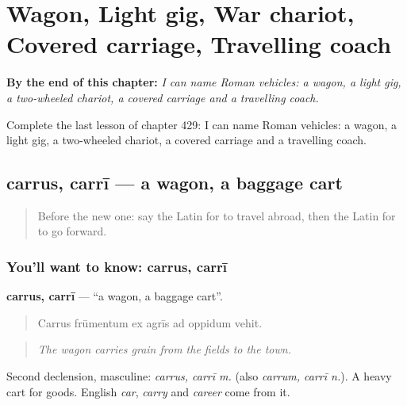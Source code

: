 
\chapter{Wagon, Light gig, War chariot, Covered carriage, Travelling coach}
\label{ch:la-wagon-light-gig-war-chariot-covered-carriage-travelling-coach}

\begin{chapteropening}
\textbf{By the end of this chapter:} \emph{I can name Roman vehicles: a wagon, a light gig, a two-wheeled chariot, a covered carriage and a travelling coach.}

Complete the last lesson of chapter 429: I can name Roman vehicles: a wagon, a light gig, a two-wheeled chariot, a covered carriage and a travelling coach.
\end{chapteropening}

\section[carrus, carrī]{carrus, carrī — a wagon, a baggage cart}

\label{lesson:LA-C429-carrus}



\begin{quote}
Before the new one: say the Latin for to travel abroad, then the Latin for to go forward.
\end{quote}

\subsection*{You'll want to know: carrus, carrī}
\textbf{carrus, carrī} — \textquotedblleft{}a wagon, a baggage cart\textquotedblright{}.

\begin{quote}
Carrus frūmentum ex agrīs ad oppidum vehit.
\end{quote}

\begin{quote}
\emph{The wagon carries grain from the fields to the town.}
\end{quote}

Second declension, masculine: \emph{carrus, carrī m.} (also \emph{carrum, carrī n.}). A heavy cart for goods. English \emph{car}, \emph{carry} and \emph{career} come from it.

